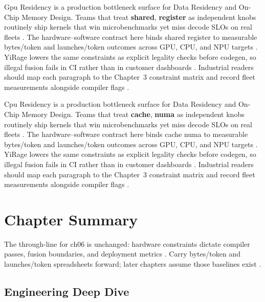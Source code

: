 Gpu Residency is a production bottleneck surface for Data Residency and On-Chip Memory Design. Teams that treat \textbf{shared}, \textbf{register} as independent knobs routinely ship kernels that win microbenchmarks yet miss decode SLOs on real fleets \citep{nvidia2022hopper,amd2024aie}. The hardware--software contract here binds shared register to measurable bytes/token and launches/token outcomes across GPU, CPU, and NPU targets \citep{semianalysis2024tma,dlbook}. YiRage lowers the same constraints as explicit legality checks before codegen, so illegal fusion fails in CI rather than in customer dashboards \citep{amd2024xdna,dao2022flashattention}. Industrial readers should map each paragraph to the Chapter~3 constraint matrix and record fleet measurements alongside compiler flags \citep{amd2024aie,kwon2023vllm}.

Cpu Residency is a production bottleneck surface for Data Residency and On-Chip Memory Design. Teams that treat \textbf{cache}, \textbf{numa} as independent knobs routinely ship kernels that win microbenchmarks yet miss decode SLOs on real fleets \citep{semianalysis2024tma,dlbook}. The hardware--software contract here binds cache numa to measurable bytes/token and launches/token outcomes across GPU, CPU, and NPU targets \citep{amd2024xdna,dao2022flashattention}. YiRage lowers the same constraints as explicit legality checks before codegen, so illegal fusion fails in CI rather than in customer dashboards \citep{amd2024aie,kwon2023vllm}. Industrial readers should map each paragraph to the Chapter~3 constraint matrix and record fleet measurements alongside compiler flags \citep{dlbook,nvidia2024cudagraphs}.

\section{Chapter Summary}
\label{sec:ch06_summary}

The through-line for ch06 is unchanged: hardware constraints dictate compiler passes, fusion boundaries, and deployment metrics \citep{memoryfloor2026,amd2024xdna}. Carry bytes/token and launches/token spreadsheets forward; later chapters assume those baselines exist \citep{semianalysis2024tma,dlbook}.


\subsection{Engineering Deep Dive}
\label{sec:ch06_deep_dive}

